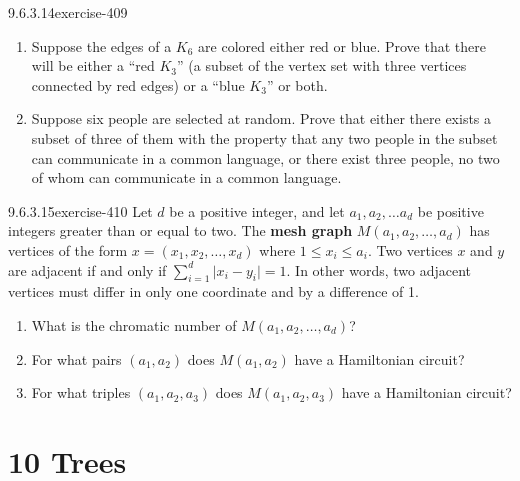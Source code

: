 \documentclass[twoside,10pt,]{book}
\newcommand{\terminology}[1]{\textbf{#1}}
\numberwithin{equation}{section}
\begin{document}
\begin{divisionsolution}{9.6.3.14}{}{exercise-409}%
\hypertarget{p-3505}{}%
\leavevmode%
\begin{enumerate}[label=(\alph*)]
\item\hypertarget{li-1627}{}\hypertarget{p-3506}{}%
Suppose the edges of a \(K_6\) are colored either red or blue. Prove that there will be either a ``red \(K_3\)'' (a subset of the vertex set with three vertices connected by red edges) or a ``blue \(K_3\)'' or both.%
\item\hypertarget{li-1628}{}\hypertarget{p-3507}{}%
Suppose six people are selected at random. Prove that either there exists a subset of three of them with the property that any two people in the subset can communicate in a common language, or there exist three people, no two of whom can communicate in a common language.%
\end{enumerate}
%
\end{divisionsolution}%
\begin{divisionsolution}{9.6.3.15}{}{exercise-410}%
\hypertarget{p-3508}{}%
Let \(d\) be a positive integer, and let \(a_1, a_2, \dots a_d\) be positive integers greater than or equal to two.  The \terminology{mesh graph} \(M(a_1,a_2,\dots,a_d)\) has vertices of the form \(x=(x_1, x_2,\dots, x_d)\) where \(1 \leq x_i \leq a_i\). Two vertices \(x\) and \(y\) are adjacent if and only if \(\sum_{i=1}^{d}{\lvert x_i-y_i \rvert} = 1\).  In other words, two adjacent vertices must differ in only one coordinate and by a difference of 1.%
\par
\hypertarget{p-3509}{}%
\leavevmode%
\begin{enumerate}[label=(\alph*)]
\item\hypertarget{li-1629}{}\hypertarget{p-3510}{}%
What is the chromatic number of  \(M(a_1,a_2,\dots,a_d)\)?%
\item\hypertarget{li-1630}{}\hypertarget{p-3511}{}%
For what pairs  \((a_1, a_2)\) does \(M(a_1, a_2)\) have a Hamiltonian circuit?%
\item\hypertarget{li-1631}{}\hypertarget{p-3512}{}%
For what triples   \((a_1, a_2, a_3)\) does \(M(a_1, a_2, a_3)\) have a Hamiltonian circuit?%
\end{enumerate}
%
\end{divisionsolution}%
\chapter*{10 Trees}
\end{document}
